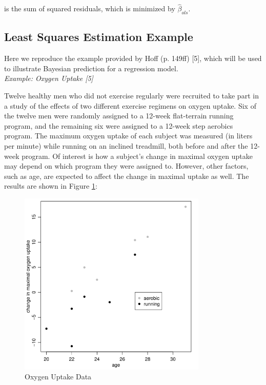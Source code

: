 \documentclass[12pt, a4paper]{article}
\begin{document}
\noindent is the sum of squared residuals, which is minimized by $\hat\beta_{ols}$.\\


\subsection{Least Squares Estimation Example}

\noindent Here we reproduce the example provided by Hoff (p. 149ff) [5], which will be used to illustrate Bayesian prediction for a regression model.\\

\noindent\textit{Example:  Oxygen Uptake [5]}

\noindent Twelve healthy men who did not exercise regularly were recruited to take part in a study of the effects of two different exercise regimens on oxygen uptake.  Six of the twelve men were randomly assigned to a 12-week flat-terrain running program, and the remaining six were assigned to a 12-week step aerobics program.  The maximum oxygen uptake of each subject was measured (in liters per minute) while running on an inclined treadmill, both before and after the 12-week program.  Of interest is how a subject's change in maximal oxygen uptake may depend on which program they were assigned to.  However, other factors, such as age, are expected to affect the change in maximal uptake as well.  The results are shown in Figure \ref{fig:OxygenData}:

\begin{figure}[ht]
  \centering
  \includegraphics[width=0.8\textwidth]{./Graphics/ExamplePlots/OxygenUptakeData}
  \caption{Oxygen Uptake Data}
  \label{fig:OxygenData}
\end{figure}
\end{document}
